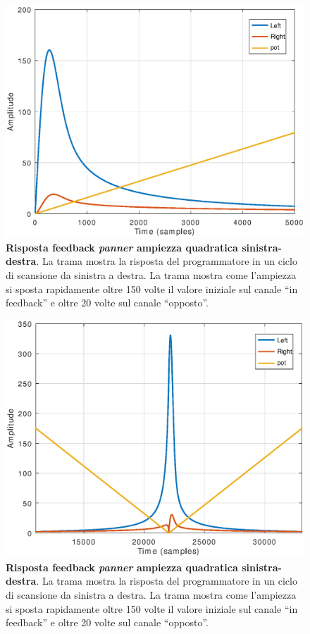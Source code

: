 \begin{figure}[t]
\centering
\includegraphics[width=1\columnwidth]{CAPITOLI/1000/IMG/lrpanfb_init}
\caption{\textbf{Risposta feedback \emph{panner} ampiezza quadratica sinistra-destra}.
La trama mostra la risposta del programmatore in un ciclo di scansione da
sinistra a destra. La trama mostra come l'ampiezza si sposta rapidamente oltre
150 volte il valore iniziale sul canale “in feedback” e oltre 20 volte sul
canale “opposto”.}
\label{fig:lrpanfb1}
\end{figure}

\begin{figure}[t]
\centering
\includegraphics[width=1\columnwidth]{CAPITOLI/1000/IMG/lrpanfbpot2}
\caption{\textbf{Risposta feedback \emph{panner} ampiezza quadratica sinistra-destra}.
La trama mostra la risposta del programmatore in un ciclo di scansione da
sinistra a destra. La trama mostra come l'ampiezza si sposta rapidamente oltre
150 volte il valore iniziale sul canale “in feedback” e oltre 20 volte sul
canale “opposto”.}
\label{fig:lrpanfb2}
\end{figure}

